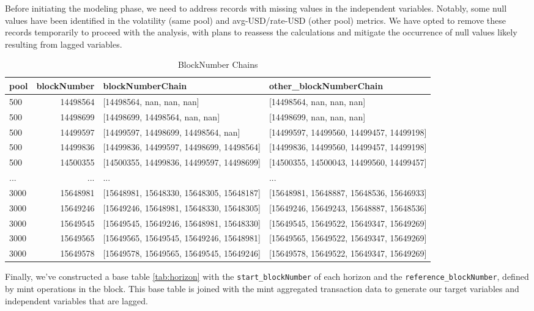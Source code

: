 \documentclass{article}
\begin{document}
{Before initiating the modeling phase, we need to address records with missing values in the independent variables. Notably, some null values have been identified in the volatility (same pool) and avg-USD/rate-USD (other pool) metrics. We have opted to remove these records temporarily to proceed with the analysis, with plans to reassess the calculations and mitigate the occurrence of null values likely resulting from lagged variables.

\begin{table}[htbp]
  \centering
  \small
  \begin{tabularx}{\linewidth}{|X|r|l|l|}
    \hline
    \textbf{pool} & \textbf{blockNumber} & \textbf{blockNumberChain} & \textbf{other\_blockNumberChain} \\
    \hline
    500 & 14498564 & [14498564, nan, nan, nan] & [14498564, nan, nan, nan] \\
    500 & 14498699 & [14498699, 14498564, nan, nan] & [14498699, nan, nan, nan] \\
    500 & 14499597 & [14499597, 14498699, 14498564, nan] & [14499597, 14499560, 14499457, 14499198] \\
    500 & 14499836 & [14499836, 14499597, 14498699, 14498564] & [14499836, 14499560, 14499457, 14499198] \\
    500 & 14500355 & [14500355, 14499836, 14499597, 14498699] & [14500355, 14500043, 14499560, 14499457] \\
    ... & ... & ... & ... \\
    3000 & 15648981 & [15648981, 15648330, 15648305, 15648187] & [15648981, 15648887, 15648536, 15646933] \\
    3000 & 15649246 & [15649246, 15648981, 15648330, 15648305] & [15649246, 15649243, 15648887, 15648536] \\
    3000 & 15649545 & [15649545, 15649246, 15648981, 15648330] & [15649545, 15649522, 15649347, 15649269] \\
    3000 & 15649565 & [15649565, 15649545, 15649246, 15648981] & [15649565, 15649522, 15649347, 15649269] \\
    3000 & 15649578 & [15649578, 15649565, 15649545, 15649246] & [15649578, 15649522, 15649347, 15649269] \\
    \hline
  \end{tabularx}
  \caption{BlockNumber Chains}
  \label{tab:chains}
\end{table}

Finally, we've constructed a base table \ref{tab:horizon} with the \texttt{start\_blockNumber} of each horizon and the \texttt{reference\_blockNumber}, defined by mint operations in the block. This base table is joined with the mint aggregated transaction data to generate our target variables and independent variables that are lagged.

}
\end{document}
